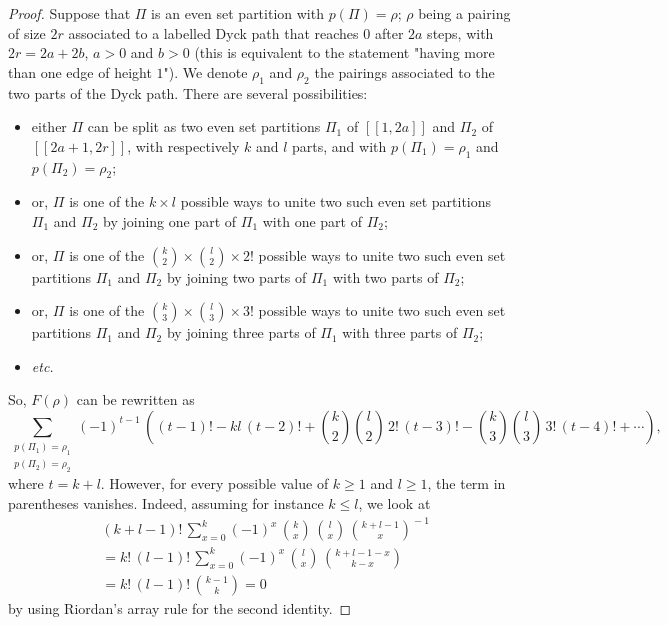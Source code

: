 \documentclass[12pt,a4paper,reqno]{amsart}
\newcommand{\lle}{\left[\!\left[}
\newcommand{\rre}{\right]\!\right]}
\theoremstyle{remark}
\begin{document}
\begin{proof}
Suppose that $\Pi$ is an even set partition with $p(\Pi)=\rho$; $\rho$ being a pairing of size $2r$ associated to a labelled Dyck path that reaches $0$ after $2a$ steps, with $2r=2a+2b$, $a>0$ and $b>0$ (this is equivalent to the statement "having more than one edge of height $1$"). We denote $\rho_1$ and $\rho_2$ the pairings associated to the two parts of the Dyck path. There are several possibilities:\vspace{1mm}
\begin{itemize}
\item either $\Pi$ can be split as two even set partitions $\Pi_1$ of $\lle 1,2a\rre$ and $\Pi_2$ of $\lle 2a+1,2r\rre$, with respectively $k$ and $l$ parts, and with $p(\Pi_1)=\rho_1$ and $p(\Pi_2)=\rho_2$;\vspace{1mm}
\item or, $\Pi$ is one of the $k\times l$ possible ways to unite two such even set partitions $\Pi_1$ and $\Pi_2$ by joining one part of $\Pi_1$ with one part of $\Pi_2$;\vspace{1mm}
\item or, $\Pi$ is one of the $\binom{k}{2}\times \binom{l}{2} \times 2!$ possible ways to unite two such even set partitions $\Pi_1$ and $\Pi_2$ by joining two parts of $\Pi_1$ with two parts of $\Pi_2$;\vspace{1mm}
\item or, $\Pi$ is one of the $\binom{k}{3}\times \binom{l}{3} \times 3!$ possible ways to unite two such even set partitions $\Pi_1$ and $\Pi_2$ by joining three parts of $\Pi_1$ with three parts of $\Pi_2$;\vspace{1mm}
\item \emph{etc.}\vspace{1mm}
\end{itemize}
So, $F(\rho)$ can be rewritten as
$$\sum_{\substack{p(\Pi_1)=\rho_1 \\ p(\Pi_2)=\rho_2} }\!\!(-1)^{t-1} \,\left((t-1)! -kl\,(t-2)!+\binom{k}{2}\binom{l}{2}\,2!\,(t-3)!-\binom{k}{3}\binom{l}{3}\,3!\,(t-4)!+\cdots\right),$$
where $t=k+l$. However, for every possible value of $k \geq 1$ and $l \geq 1$, the term in parentheses vanishes. Indeed, assuming for instance $k \leq l$, we look at
\begin{align*}
&(k+l-1)!\,\sum_{x=0}^{k} (-1)^x \, \binom{k}{x}\,\binom{l}{x} \,\binom{k+l-1}{x}^{\!\!-1}\\
 &=k!\,(l-1)!\,\sum_{x=0}^{k} (-1)^x \,\binom{l}{x} \,\binom{k+l-1-x}{k-x}\\
&=k!\,(l-1)!\,\binom{k-1}{k}=0
\end{align*}
by using Riordan's array rule for the second identity.  %
\end{proof}\bigskip
\end{document}
